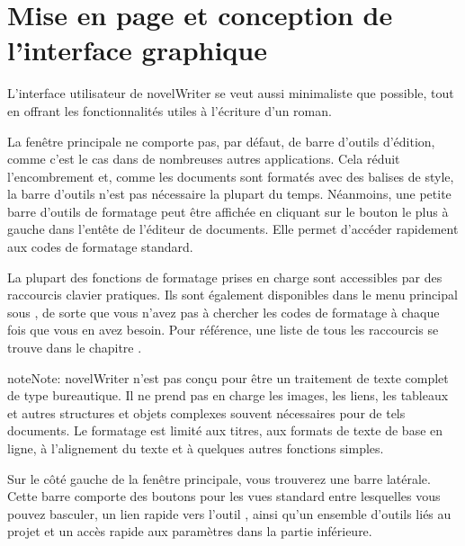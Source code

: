 \documentclass[a4paper,11pt,french]{sphinxmanual}
\begin{document}
\section{Mise en page et conception de l’interface graphique}
\label{\detokenize{usage_breakdown:gui-layout-and-design}}\label{\detokenize{usage_breakdown:a-breakdown-design}}
\sphinxAtStartPar
L’interface utilisateur de novelWriter se veut aussi minimaliste que possible, tout en offrant les fonctionnalités utiles à l’écriture d’un roman.

\sphinxAtStartPar
La fenêtre principale ne comporte pas, par défaut, de barre d’outils d’édition, comme c’est le cas dans de nombreuses autres applications. Cela réduit l’encombrement et, comme les documents sont formatés avec des balises de style, la barre d’outils n’est pas nécessaire la plupart du temps. Néanmoins, une petite barre d’outils de formatage peut être affichée en cliquant sur le bouton le plus à gauche dans l’en\sphinxhyphen{}tête de l’éditeur de documents. Elle permet d’accéder rapidement aux codes de formatage standard.

\sphinxAtStartPar
La plupart des fonctions de formatage prises en charge sont accessibles par des raccourcis clavier pratiques. Ils sont également disponibles dans le menu principal sous , de sorte que vous n’avez pas à chercher les codes de formatage à chaque fois que vous en avez besoin. Pour référence, une liste de tous les raccourcis se trouve dans le chapitre {\hyperref[\detokenize{usage_shortcuts:a-kb}]{}}.

\begin{sphinxadmonition}{note}{Note:}
\sphinxAtStartPar
novelWriter n’est pas conçu pour être un traitement de texte complet de type bureautique. Il ne prend pas en charge les images, les liens, les tableaux et autres structures et objets complexes souvent nécessaires pour de tels documents. Le formatage est limité aux titres, aux formats de texte de base en ligne, à l’alignement du texte et à quelques autres fonctions simples.
\end{sphinxadmonition}

\sphinxAtStartPar
Sur le côté gauche de la fenêtre principale, vous trouverez une barre latérale. Cette barre comporte des boutons pour les vues standard entre lesquelles vous pouvez basculer, un lien rapide vers l’outil , ainsi qu’un ensemble d’outils liés au projet et un accès rapide aux paramètres dans la partie inférieure.
\end{document}
